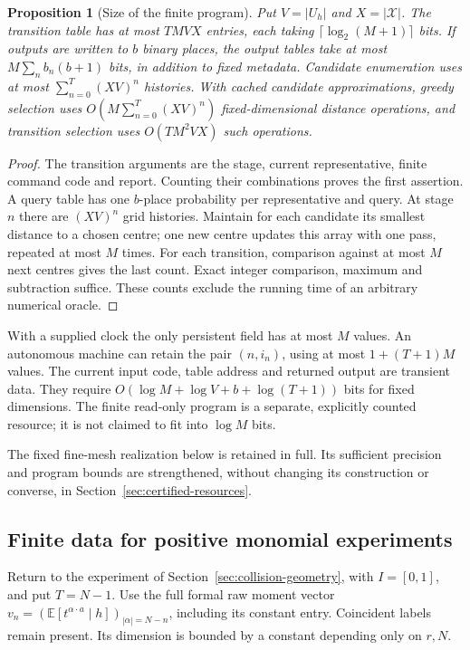 \documentclass[11pt]{amsart}
\newtheorem{proposition}[theorem]{Proposition}
\theoremstyle{definition}\newtheorem{definition}[theorem]{Definition}
\theoremstyle{remark}\newtheorem{remark}[theorem]{Remark}
\newcommand{\E}{\mathbb E}\newcommand{\Prob}{\mathbb P}
\begin{document}
\begin{proposition}[Size of the finite program]\label{prop:compiler-size}
Put $V=|U_h|$ and $X=|\mathcal X|$. The transition table has at most
$TMVX$ entries, each taking $\lceil\log_2(M+1)\rceil$ bits. If outputs
are written to $b$ binary places, the output tables take at most
$M\sum_nb_n(b+1)$ bits, in addition to fixed metadata. Candidate
enumeration uses at most $\sum_{n=0}^T(XV)^n$ histories. With cached
candidate approximations, greedy selection uses
$O(M\sum_{n=0}^T(XV)^n)$ fixed-dimensional distance operations, and
transition selection uses $O(TM^2VX)$ such operations.
\end{proposition}
\begin{proof}
The transition arguments are the stage, current representative, finite
command code and report. Counting their combinations proves the first
assertion. A query table has one $b$-place probability per representative
and query. At stage $n$ there are $(XV)^n$ grid histories. Maintain for
each candidate its smallest distance to a chosen centre; one new centre
updates this array with one pass, repeated at most $M$ times. For each
transition, comparison against at most $M$ next centres gives the last
count. Exact integer comparison, maximum and subtraction suffice.
These counts exclude the running time of an arbitrary numerical oracle.
\end{proof}

With a supplied clock the only persistent field has at most $M$ values.
An autonomous machine can retain the pair $(n,i_n)$, using at most
$1+(T+1)M$ values. The current input code, table address and returned
output are transient data. They require $O(\log M+\log V+b+\log(T+1))$
bits for fixed dimensions. The finite read-only program is a separate,
explicitly counted resource; it is not claimed to fit into $\log M$ bits.

The fixed fine-mesh realization below is retained in full. Its sufficient
precision and program bounds are strengthened, without changing its
construction or converse, in Section~\ref{sec:certified-resources}.

\subsection{Finite data for positive monomial experiments}
Return to the experiment of Section~\ref{sec:collision-geometry}, with
$I=[0,1]$, and put $T=N-1$. Use the full formal raw moment vector
$v_n=(\E[t^{\alpha\cdot a}\mid h])_{|\alpha|=N-n}$, including its
constant entry. Coincident labels remain present. Its dimension is
bounded by a constant depending only on $r,N$.
\end{document}
